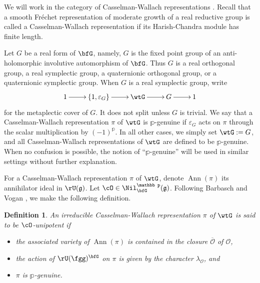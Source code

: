 \documentclass[12pt,a4paper]{amsart}
\newcommand{\CO}{{\mathcal {O}}}
\DeclareMathOperator{\Ann}{Ann}
\newcommand{\g}{\mathfrak g}
\numberwithin{equation}{section}
\newtheorem{dfnl}[thm]{Definition}
\theoremstyle{remark}
\begin{document}
We will work in the category of Casselman-Wallach representations \cite{Ca89, Wa2}. Recall that a  smooth Fr\'echet representation of  moderate growth  of a real reductive group is called a Casselman-Wallach representation if its Harish-Chandra module has  finite length.

Let $G$ be a real form of $\bfG$, namely, $G$ is the fixed point group of an
anti-holomorphic involutive automorphism of $\bfG$. Thus $G$ is a real
orthogonal group, a real symplectic group, a quaternionic orthogonal group, or a
quaternionic symplectic group.  When $G$ is a real symplectic group, write
\[
  \xymatrix@R=0em{ 1\ar[r] &\{1, \varepsilon_G\}\ar[r] &\wtG \ar[r] & G\ar[r] &1
  }
\]
for the metaplectic cover of $G$. It does not split unless $G$ is trivial.
We say that a Casselman-Wallach representation $\pi$ of $\wtG$ is $\mathbb p$-genuine if
$\varepsilon_G$ acts on $\pi$ through the scalar multiplication by
$(-1)^{\mathbb p}$.  %
In all other cases, we simply set $\wtG:=G$, and  all Casselman-Wallach representations of $\wtG$ are defined to be $\mathbb p$-genuine. When no confusion is possible, the notion of
``$\mathbb p$-genuine'' will be used in similar settings without further
explanation.



For a Casselman-Wallach representation $\pi$ of $\wtG$, denote $\Ann(\pi)$ its
annihilator ideal in $\rU(\g)$.  Let $\cO \in \Nil^{\mathbb p}_{\bfG}(\g)$.
Following Barbasch and Vogan \cite{BVUni, ABV}, we make the following definition.

\begin{dfnl}\label{defunip1}
  An irreducible Casselman-Wallach representation $\pi$ of $\wtG$ is said to be
  $\cO$-unipotent if
  \begin{itemize}
  \item the associated variety of  $\Ann(\pi)$ is contained in the closure $\overline \CO$ of $\CO$,
  \item the action of $\rU(\fgg)^{\bfG}$ on $\pi$ is given by the character $\lambda_\CO$, and
  \item $\pi$ is $\mathbb p$-genuine.
  \end{itemize}

\end{dfnl}
\end{document}
